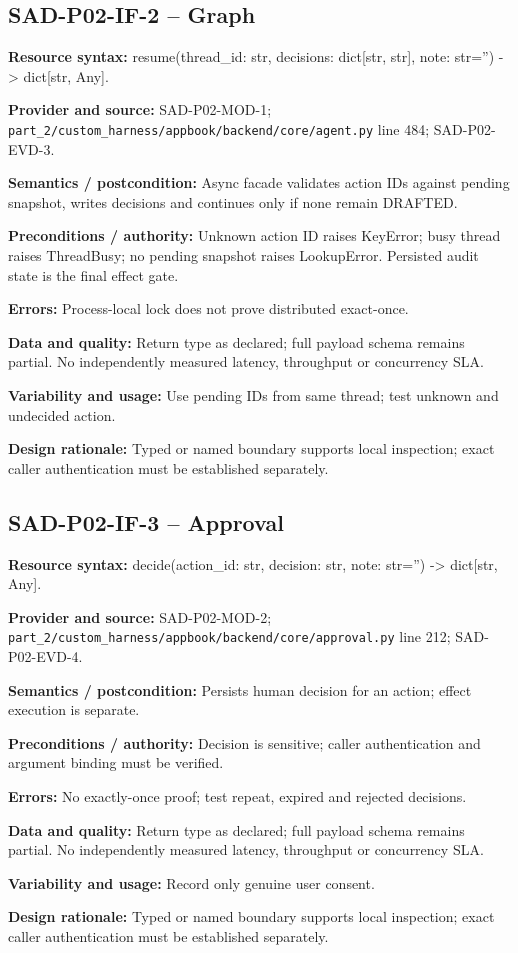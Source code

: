 \documentclass[10pt,letterpaper]{article}
\begin{document}
\subsection{SAD-P02-IF-2 -- Graph}
{\raggedright \textbf{Resource syntax:} resume(\allowbreak{}thread\_\allowbreak{}id: str, decisions: dict[str, str], note: str='') -> dict[str, Any].\par}
\textbf{Provider and source:} SAD-P02-MOD-1; \nolinkurl{part_2/custom_harness/appbook/backend/core/agent.py} line 484; SAD-P02-EVD-3.\par
\textbf{Semantics / postcondition:} Async facade validates action IDs against pending snapshot, writes decisions and continues only if none remain DRAFTED.\par
\textbf{Preconditions / authority:} Unknown action ID raises KeyError; busy thread raises ThreadBusy; no pending snapshot raises LookupError. Persisted audit state is the final effect gate.\par
\textbf{Errors:} Process-local lock does not prove distributed exact-once.\par
\textbf{Data and quality:} Return type as declared; full payload schema remains partial. No independently measured latency, throughput or concurrency SLA.\par
\textbf{Variability and usage:} Use pending IDs from same thread; test unknown and undecided action.\par
\textbf{Design rationale:} Typed or named boundary supports local inspection; exact caller authentication must be established separately.\par

\subsection{SAD-P02-IF-3 -- Approval}
{\raggedright \textbf{Resource syntax:} decide(\allowbreak{}action\_\allowbreak{}id: str, decision: str, note: str='') -> dict[str, Any].\par}
\textbf{Provider and source:} SAD-P02-MOD-2; \nolinkurl{part_2/custom_harness/appbook/backend/core/approval.py} line 212; SAD-P02-EVD-4.\par
\textbf{Semantics / postcondition:} Persists human decision for an action; effect execution is separate.\par
\textbf{Preconditions / authority:} Decision is sensitive; caller authentication and argument binding must be verified.\par
\textbf{Errors:} No exactly-once proof; test repeat, expired and rejected decisions.\par
\textbf{Data and quality:} Return type as declared; full payload schema remains partial. No independently measured latency, throughput or concurrency SLA.\par
\textbf{Variability and usage:} Record only genuine user consent.\par
\textbf{Design rationale:} Typed or named boundary supports local inspection; exact caller authentication must be established separately.\par
\end{document}
